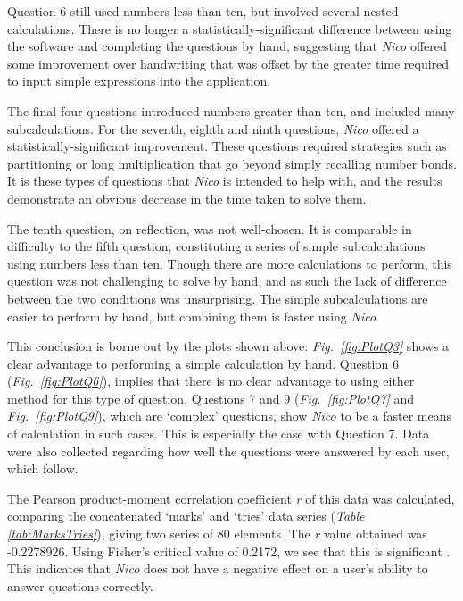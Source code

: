 \documentclass[12pt,twoside,notitlepage,xetex]{report}
\begin{document}
 Question 6 still used numbers less than ten, but involved several nested calculations.  There is no longer a statistically-significant difference between using the software and completing the questions by hand, suggesting that \emph{Nico} offered some improvement over handwriting that was offset by the greater time required to input simple expressions into the application.

The final four questions introduced numbers greater than ten, and included many subcalculations.  For the seventh, eighth and ninth questions, \emph{Nico} offered a statistically-significant improvement.  These questions required strategies such as partitioning or long multiplication that go beyond simply recalling number bonds.  It is these types of questions that \emph{Nico} is intended to help with, and the results demonstrate an obvious decrease in the time taken to solve them.

The tenth question, on reflection, was not well-chosen.  It is comparable in difficulty to the fifth question, constituting a series of simple subcalculations using numbers less than ten.  Though there are more calculations to perform,  this question was not challenging to solve by hand, and as such the lack of difference between the two conditions was unsurprising.  The simple subcalculations are easier to perform by hand, but combining them is faster using \emph{Nico}.

This conclusion is borne out by the plots shown above: \emph{Fig.~\ref{fig:PlotQ3}} shows a clear advantage to performing a simple calculation by hand.  Question 6 (\emph{Fig.~\ref{fig:PlotQ6}}), implies that there is no clear advantage to using either method for this type of question.  Questions 7 and 9 (\emph{Fig.~\ref{fig:PlotQ7}} and \emph{Fig.~\ref{fig:PlotQ9}}), which are `complex' questions, show \emph{Nico} to be a faster means of calculation in such cases.  This is especially the case with Question 7.  Data were also collected regarding how well the questions were answered by each user, which follow.

The Pearson product-moment correlation coefficient \emph{r} of this data was calculated, comparing the concatenated `marks' and `tries' data series (\emph{Table \ref{tab:MarksTries}}), giving two series of 80 elements.  The \emph{r} value obtained was -0.2278926.  Using Fisher's critical value of 0.2172, we see that this is significant \cite{Fisher1990}.  This indicates that \emph{Nico} does not have a negative effect on a user's ability to answer questions correctly.
\end{document}
